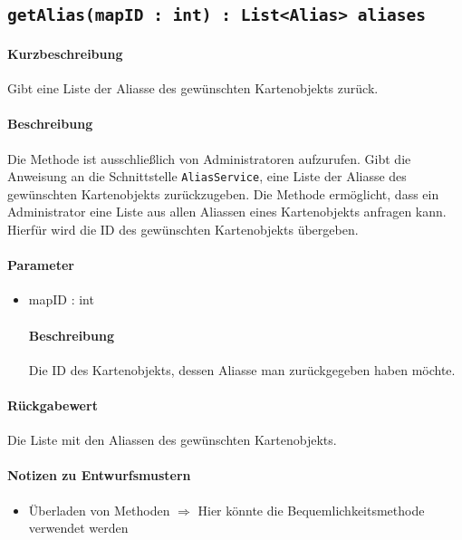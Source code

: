 \subsection{\texttt{getAlias(mapID : int) : List<Alias> aliases}}%
\paragraph*{Kurzbeschreibung}
Gibt eine Liste der Aliasse des gewünschten Kartenobjekts zurück.
\paragraph*{Beschreibung}
Die Methode ist ausschließlich von Administratoren aufzurufen.
Gibt die Anweisung an die Schnittstelle \texttt{AliasService}, eine Liste der Aliasse des gewünschten Kartenobjekts zurückzugeben.
Die Methode ermöglicht, dass ein Administrator eine Liste aus allen Aliassen eines Kartenobjekts anfragen kann.
Hierfür wird die ID des gewünschten Kartenobjekts übergeben.
\paragraph*{Parameter}
\begin{itemize}
    \item mapID : int
    		\paragraph*{Beschreibung}
    		Die ID des Kartenobjekts, dessen Aliasse man zurückgegeben haben möchte.
\end{itemize}
\paragraph*{Rückgabewert}
Die Liste mit den Aliassen des gewünschten Kartenobjekts.

\paragraph*{Notizen zu Entwurfsmustern}
\begin{itemize}
	\item Überladen von Methoden $\Rightarrow$ Hier könnte die Bequemlichkeitsmethode verwendet werden
\end{itemize}
